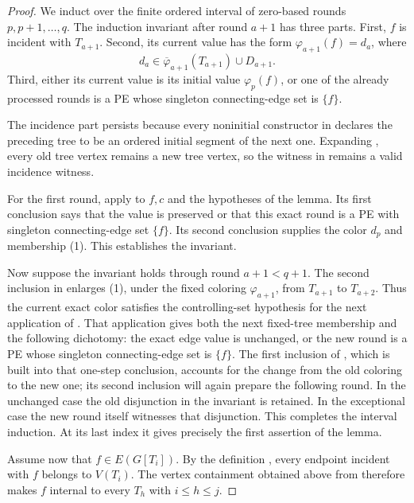 \begin{proof}
We induct over the finite ordered interval of zero-based rounds
\(p,p+1,\ldots,q\).  The induction invariant after round \(a+1\) has
three parts.  First, \(f\) is incident with \(T_{a+1}\).  Second, its
current value has the form \(\varphi_{a+1}(f)=d_a\), where
\[
 d_a\in\overline\varphi_{a+1}(T_{a+1})\cup D_{a+1}.              \tag{1}
\]
Third, either its current value is its initial value
\(\varphi_p(f)\), or one of the already processed rounds is a PE whose
singleton connecting-edge set is \(\{f\}\).

The incidence part persists because every noninitial constructor in
 declares the preceding tree to be an
ordered initial segment of the next one.  Expanding
, every old tree vertex remains a
new tree vertex, so the witness in  remains a
valid incidence witness.

For the first round, apply  to
\(f,c\) and the hypotheses of the lemma.  Its first conclusion says
that the value is preserved or that this exact round is a PE with
singleton connecting-edge set \(\{f\}\).  Its second conclusion supplies
the color \(d_p\) and membership (1).  This establishes the invariant.

Now suppose the invariant holds through round \(a+1<q+1\).  The second
inclusion in  enlarges (1), under the
fixed coloring \(\varphi_{a+1}\), from \(T_{a+1}\) to \(T_{a+2}\).
Thus the current exact color satisfies the controlling-set hypothesis for
the next application of .  That
application gives both the next fixed-tree membership and the following
dichotomy: the exact edge value is unchanged, or the new round is a PE
whose singleton connecting-edge set is \(\{f\}\).  The first inclusion
of , which is built into that one-step
conclusion, accounts for the change from the old coloring to the new one;
its second inclusion will again prepare the following round.  In the
unchanged case the old disjunction in the invariant is retained.  In the
exceptional case the new round itself witnesses that disjunction.  This
completes the interval induction.  At its last index it gives precisely
the first assertion of the lemma.

Assume now that \(f\in E(G[T_i])\).  By the definition
, every endpoint incident with \(f\) belongs to
\(V(T_i)\).  The vertex containment obtained above from
 therefore makes \(f\) internal to
every \(T_h\) with \(i\leq h\leq j\).


\end{proof}
